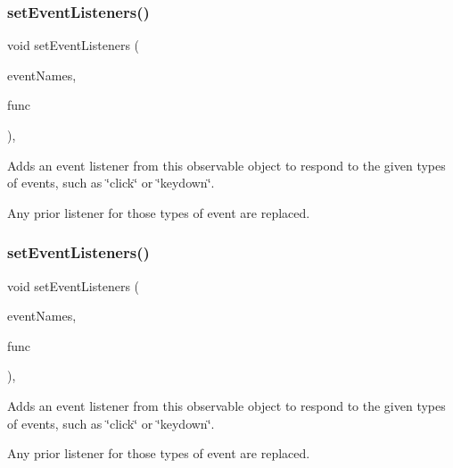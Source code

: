 \subsubsection{\texorpdfstring{set\+Event\+Listeners()}{setEventListeners()}\hspace{0.1cm}{\footnotesize\ttfamily [1/2]}}
{\footnotesize\ttfamily void set\+Event\+Listeners (\begin{DoxyParamCaption}\item[{std\+::initializer\+\_\+list$<$ std\+::string $>$}]{event\+Names,  }\item[{G\+Event\+Listener}]{func }\end{DoxyParamCaption})\hspace{0.3cm}{\ttfamily [protected]}, {\ttfamily [virtual]}}



Adds an event listener from this observable object to respond to the given types of events, such as \char`\"{}click\char`\"{} or \char`\"{}keydown\char`\"{}. 

Any prior listener for those types of event are replaced. \mbox{\label{classGObservable_a7867184bbb686f74fae8a4db927da799}} 
\subsubsection{\texorpdfstring{set\+Event\+Listeners()}{setEventListeners()}\hspace{0.1cm}{\footnotesize\ttfamily [2/2]}}
{\footnotesize\ttfamily void set\+Event\+Listeners (\begin{DoxyParamCaption}\item[{std\+::initializer\+\_\+list$<$ std\+::string $>$}]{event\+Names,  }\item[{G\+Event\+Listener\+Void}]{func }\end{DoxyParamCaption})\hspace{0.3cm}{\ttfamily [protected]}, {\ttfamily [virtual]}}



Adds an event listener from this observable object to respond to the given types of events, such as \char`\"{}click\char`\"{} or \char`\"{}keydown\char`\"{}. 

Any prior listener for those types of event are replaced. \mbox{\label{classGObservable_afaa30b2a9e0f378fd1c70d2f1d0b8216}} 
